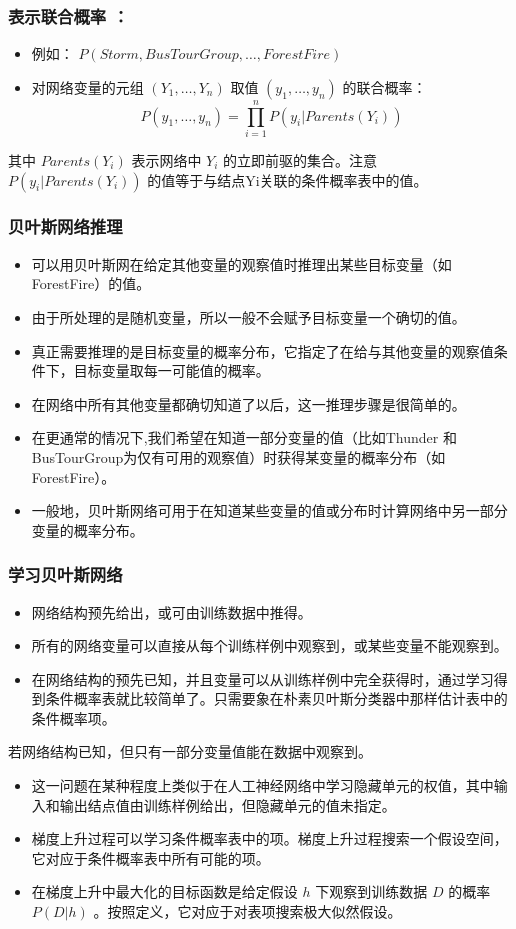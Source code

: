 \documentclass{beamer}
\begin{document}
\begin{frame}
\frametitle{表示联合概率 ：}
\label{sec-10-6}

\begin{itemize}
\item 例如： $P(Storm, BusTourGroup, \ldots, ForestFire)$
\item 对网络变量的元组 $(Y_1, \ldots, Y_n)$ 取值 $(y_1, \ldots, y_n)$ 的联合概率：
   $$P(y_1, \ldots, y_n) = \prod_{i=1}^{n} P(y_i | Parents(Y_i))$$
\end{itemize}
其中 $Parents(Y_i)$ 表示网络中 $Y_i$ 的立即前驱的集合。注意 $P(y_i|Parents(Y_i))$ 的值等于与结点Yi关联的条件概率表中的值。
\end{frame}
\begin{frame}
\frametitle{贝叶斯网络推理}
\label{sec-10-7}


\begin{itemize}
\item 可以用贝叶斯网在给定其他变量的观察值时推理出某些目标变量（如ForestFire）的值。
\item 由于所处理的是随机变量，所以一般不会赋予目标变量一个确切的值。
\item 真正需要推理的是目标变量的概率分布，它指定了在给与其他变量的观察值条件下，目标变量取每一可能值的概率。
\item 在网络中所有其他变量都确切知道了以后，这一推理步骤是很简单的。
\item 在更通常的情况下,我们希望在知道一部分变量的值（比如Thunder 和BusTourGroup为仅有可用的观察值）时获得某变量的概率分布（如ForestFire）。
\item 一般地，贝叶斯网络可用于在知道某些变量的值或分布时计算网络中另一部分变量的概率分布。
\end{itemize}
\end{frame}
\begin{frame}
\frametitle{学习贝叶斯网络}
\label{sec-10-8}


\begin{itemize}
\item 网络结构预先给出，或可由训练数据中推得。
\item 所有的网络变量可以直接从每个训练样例中观察到，或某些变量不能观察到。
\item 在网络结构的预先已知，并且变量可以从训练样例中完全获得时，通过学习得到条件概率表就比较简单了。只需要象在朴素贝叶斯分类器中那样估计表中的条件概率项。
\end{itemize}

若网络结构已知，但只有一部分变量值能在数据中观察到。
\begin{itemize}
\item 这一问题在某种程度上类似于在人工神经网络中学习隐藏单元的权值，其中输入和输出结点值由训练样例给出，但隐藏单元的值未指定。
\item 梯度上升过程可以学习条件概率表中的项。梯度上升过程搜索一个假设空间，它对应于条件概率表中所有可能的项。
\item 在梯度上升中最大化的目标函数是给定假设 $h$ 下观察到训练数据 $D$ 的概率 $P(D|h)$ 。按照定义，它对应于对表项搜索极大似然假设。
\end{itemize}
\end{frame}
\end{document}
